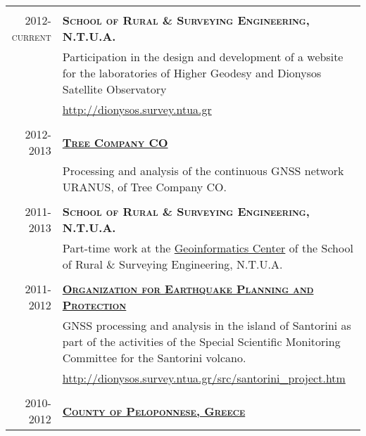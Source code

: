\documentclass[9pt]{extarticle} %
\begin{document}
\begin{longtable}{r|p{13cm}}
%
\multicolumn{2}{c}{} \\
\textsc{2012-current} & \textbf{\textsc{School of Rural \& Surveying Engineering, N.T.U.A.}}\\
  & Participation in the design and development of a website for the laboratories of Higher Geodesy and Dionysos Satellite Observatory\\
  & \url{http://dionysos.survey.ntua.gr}\\
%
\multicolumn{2}{c}{} \\
\textsc{2012-2013} & \textbf{\textsc{\href{http://www.treecomp.gr/}{Tree Company CO}}}\\
  & Processing and analysis of the continuous GNSS network URANUS, of Tree Company CO.\\
%
\multicolumn{2}{c}{} \\
\textsc{2011-2013} & \textbf{\textsc{School of Rural \& Surveying Engineering, N.T.U.A.}}\\
  & Part-time work at the \href{http://portal.survey.ntua.gr/main/geocenter/geocen-g.html}{Geoinformatics Center} of the School of Rural \& Surveying Engineering, N.T.U.A.\\
%
\multicolumn{2}{c}{} \\
\textsc{2011-2012} & \textbf{\textsc{\href{http://www.oasp.gr/}{Organization for Earthquake Planning and Protection}}}\\
  & GNSS processing and analysis in the island of Santorini as part of the activities of the Special Scientific Monitoring Committee for the Santorini volcano.\\
  & \url{http://dionysos.survey.ntua.gr/src/santorini_project.htm}\\
%
\multicolumn{2}{c}{}\\
\textsc{2010-2012} & \textbf{\textsc{\href{http://www.landslides.gr/index.php?lang=en}{County of Peloponnese, Greece}}}\\

\end{longtable}
\end{document}

